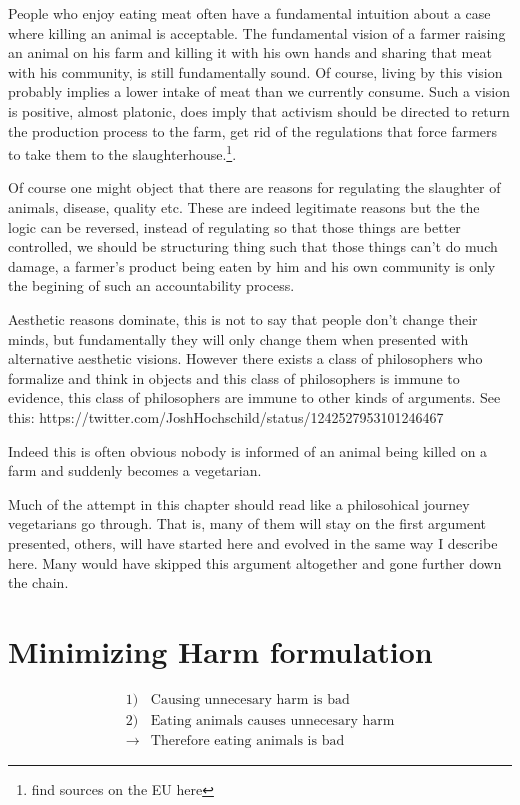 \documentclass[12pt]{report}
\numberwithin{equation}{section}
\begin{document}
People who enjoy eating meat often have a fundamental intuition about a case where killing an animal is acceptable. The fundamental vision of a farmer raising an animal on his farm and killing it with his own hands and sharing that meat with his community, is still fundamentally sound. Of course, living by this vision probably implies a lower intake of meat than we currently consume. Such a vision is positive, almost platonic, does imply that activism should be directed to return the production process to the farm, get rid of the regulations that force farmers to take them to the slaughterhouse.\footnote{find sources on the EU here}. 

Of course one might object that there are reasons for regulating the slaughter of animals, disease, quality etc. These are indeed legitimate reasons but the the logic can be reversed, instead of regulating so that those things are better controlled, we should be structuring thing such that those things can't do much damage, a farmer's product being eaten by him and his own community is only the begining of such an accountability process. 

Aesthetic reasons dominate, this is not to say that people don't change their minds, but fundamentally they will only change them when presented with alternative aesthetic visions. However there exists a class of philosophers who formalize and think in objects and this class of philosophers is immune to evidence, this class of philosophers are immune to other kinds of arguments.
See this: https://twitter.com/JoshHochschild/status/1242527953101246467

Indeed this is often obvious nobody is informed of an animal being killed on a farm and suddenly becomes a vegetarian.

Much of the attempt in this chapter should read like a philosohical journey vegetarians go through. That is, many of them will stay on the first argument presented, others, will have started here and evolved in the same way I describe here. Many would have skipped this argument altogether and gone further down the chain. 

\section{Minimizing Harm formulation}


\begin{tcolorbox}[enhanced,%
  colback=green!25!black!10!white,colframe=green!75!black,title=Fit box (5cm),
  drop fuzzy shadow,watermark color=white,watermark text=Fit]
\begin{align*}
1)& \text{Causing unnecesary harm is bad} \\
2)& \text{Eating animals causes unnecesary harm} \\
\rightarrow& \text{Therefore eating animals is bad}
\end{align*}
\end{tcolorbox}
\end{document}
